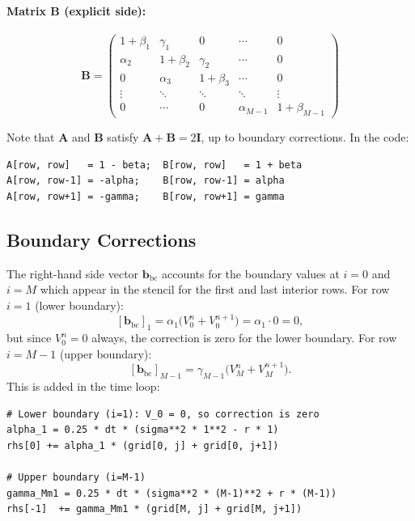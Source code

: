\documentclass[12pt, a4paper]{article}
\begin{document}
\paragraph{Matrix $\mathbf{B}$ (explicit side):}
\begin{equation}
    \mathbf{B} =
    \begin{pmatrix}
    1+\beta_1   & \gamma_1   & 0          & \cdots & 0 \\
    \alpha_2    & 1+\beta_2  & \gamma_2   & \cdots & 0 \\
    0           & \alpha_3   & 1+\beta_3  & \cdots & 0 \\
    \vdots      & \ddots     & \ddots     & \ddots & \vdots \\
    0           & \cdots     & 0          & \alpha_{M-1} & 1+\beta_{M-1}
    \end{pmatrix}
    \label{eq:B_matrix}
\end{equation}

Note that $\mathbf{A}$ and $\mathbf{B}$ satisfy $\mathbf{A} + \mathbf{B} =
2\mathbf{I}$, up to boundary corrections. In the code:
\begin{lstlisting}
A[row, row]   = 1 - beta;  B[row, row]   = 1 + beta
A[row, row-1] = -alpha;    B[row, row-1] = alpha
A[row, row+1] = -gamma;    B[row, row+1] = gamma
\end{lstlisting}

\subsection{Boundary Corrections}

The right-hand side vector $\bm{b}_{\text{bc}}$ accounts for the
boundary values at $i = 0$ and $i = M$ which appear in the stencil for
the first and last interior rows. For row $i = 1$ (lower boundary):
\[
    [\bm{b}_{\text{bc}}]_1
    = \alpha_1 \bigl(V_0^n + V_0^{n+1}\bigr)
    = \alpha_1 \cdot 0 = 0,
\]
but since $V_0^n = 0$ always, the correction is zero for the lower boundary.
For row $i = M-1$ (upper boundary):
\[
    [\bm{b}_{\text{bc}}]_{M-1}
    = \gamma_{M-1}\bigl(V_M^n + V_M^{n+1}\bigr).
\]
This is added in the time loop:
\begin{lstlisting}
# Lower boundary (i=1): V_0 = 0, so correction is zero
alpha_1 = 0.25 * dt * (sigma**2 * 1**2 - r * 1)
rhs[0] += alpha_1 * (grid[0, j] + grid[0, j+1])

# Upper boundary (i=M-1)
gamma_Mm1 = 0.25 * dt * (sigma**2 * (M-1)**2 + r * (M-1))
rhs[-1]  += gamma_Mm1 * (grid[M, j] + grid[M, j+1])
\end{lstlisting}
\end{document}
